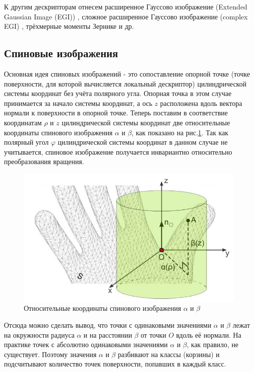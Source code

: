 \documentclass[14pt]{article}
\numberwithin{figure}{section}
\numberwithin{equation}{section}
\begin{document}
К другим дескрипторам отнесем расширенное Гауссово изображение (Extended Gaussian Image (EGI)) \cite{Horn}, сложное расширенное Гауссово изображение (complex EGI) \cite{Kang}, трёхмерные моменты Зернике \cite{Novotni} и др.

\subsection{Спиновые изображения}

Основная идея спиновых изображений - это сопоставление опорной точке (точке поверхности, для которой вычисляется локальный дескриптор) цилиндрической системы координат без учёта полярного угла. Опорная точка в этом случае принимается за начало системы координат, а ось $z$ расположена вдоль вектора нормали к поверхности в опорной точке. Теперь поставим в соответствие координатам $\rho$ и $z$ цилиндрической системы координат две относительные координаты спинового изображения $\alpha$ и $\beta$, как показано на рис.\ref{ris:2}. Так как полярный угол $\varphi$ цилиндрической системы координат в данном случае не учитывается, спиновое изображение получается инвариантно относительно преобразования вращения.

\begin{figure}[h]
	\begin{center}
		\includegraphics[scale=0.9]{2.JPG}
		\caption{Относительные координаты спинового изображения $\alpha$ и $\beta$}
		\label{ris:2}
	\end{center}
\end{figure}

Отсюда можно сделать вывод, что точки с одинаковыми значениями $\alpha$ и $\beta$ лежат на окружности радиуса $\alpha$ и на расстоянии $\beta$ от точки $O$ вдоль её нормали. На практике точек с абсолютно одинаковыми значениями $\alpha$ и $\beta$, как правило, не существует. Поэтому значения $\alpha$ и $\beta$ разбивают на классы (корзины) и подсчитывают количество точек поверхности, попавших в каждый класс.
\end{document}
